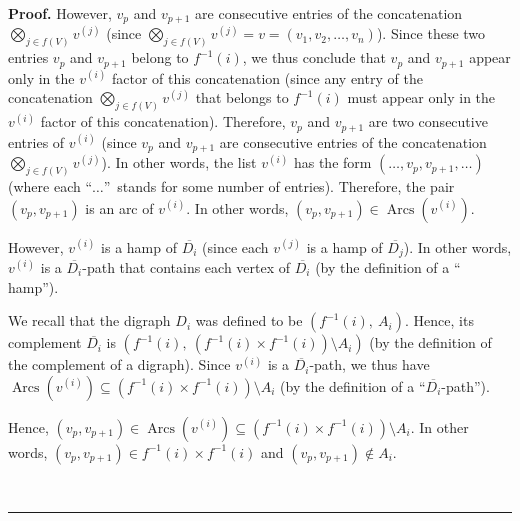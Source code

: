 \documentclass[numbers=enddot,12pt,final,onecolumn,notitlepage]{scrartcl}%
\numberwithin{exer}{section}
\theoremstyle{definition}
\newenvironment{proof}[1][Proof]{\noindent\textbf{#1.} }{\ \rule{0.5em}{0.5em}}
\newenvironment{verlong}{}{}
\begin{document}
\begin{verlong}
\begin{proof}
However, $v_{p}$ and $v_{p+1}$ are consecutive entries of the concatenation
$\bigotimes\limits_{j\in f\left(  V\right)  }v^{\left(  j\right)  }$ (since
$\bigotimes\limits_{j\in f\left(  V\right)  }v^{\left(  j\right)  }=v=\left(
v_{1},v_{2},\ldots,v_{n}\right)  $). Since these two entries $v_{p}$ and
$v_{p+1}$ belong to $f^{-1}\left(  i\right)  $, we thus conclude that $v_{p}$
and $v_{p+1}$ appear only in the $v^{\left(  i\right)  }$ factor of this
concatenation (since any entry of the concatenation $\bigotimes\limits_{j\in
f\left(  V\right)  }v^{\left(  j\right)  }$ that belongs to $f^{-1}\left(
i\right)  $ must appear only in the $v^{\left(  i\right)  }$ factor of this
concatenation). Therefore, $v_{p}$ and $v_{p+1}$ are two consecutive entries
of $v^{\left(  i\right)  }$ (since $v_{p}$ and $v_{p+1}$ are consecutive
entries of the concatenation $\bigotimes\limits_{j\in f\left(  V\right)
}v^{\left(  j\right)  }$). In other words, the list $v^{\left(  i\right)  }$
has the form $\left(  \ldots,v_{p},v_{p+1},\ldots\right)  $ (where each
\textquotedblleft$\ldots$\textquotedblright\ stands for some number of
entries). Therefore, the pair $\left(  v_{p},v_{p+1}\right)  $ is an arc of
$v^{\left(  i\right)  }$. In other words, $\left(  v_{p},v_{p+1}\right)
\in\operatorname*{Arcs}\left(  v^{\left(  i\right)  }\right)  $.

However, $v^{\left(  i\right)  }$ is a hamp of $\overline{D_{i}}$ (since each
$v^{\left(  j\right)  }$ is a hamp of $\overline{D_{j}}$). In other words,
$v^{\left(  i\right)  }$ is a $\overline{D_{i}}$-path that contains each
vertex of $\overline{D_{i}}$ (by the definition of a \textquotedblleft
hamp\textquotedblright).

We recall that the digraph $D_{i}$ was defined to be $\left(  f^{-1}\left(
i\right)  ,\ A_{i}\right)  $. Hence, its complement $\overline{D_{i}}$ is
$\left(  f^{-1}\left(  i\right)  ,\ \left(  f^{-1}\left(  i\right)  \times
f^{-1}\left(  i\right)  \right)  \setminus A_{i}\right)  $ (by the definition
of the complement of a digraph). Since $v^{\left(  i\right)  }$ is a
$\overline{D_{i}}$-path, we thus have $\operatorname*{Arcs}\left(  v^{\left(
i\right)  }\right)  \subseteq\left(  f^{-1}\left(  i\right)  \times
f^{-1}\left(  i\right)  \right)  \setminus A_{i}$ (by the definition of a
\textquotedblleft$\overline{D_{i}}$-path\textquotedblright).

Hence, $\left(  v_{p},v_{p+1}\right)  \in\operatorname*{Arcs}\left(
v^{\left(  i\right)  }\right)  \subseteq\left(  f^{-1}\left(  i\right)  \times
f^{-1}\left(  i\right)  \right)  \setminus A_{i}$. In other words, $\left(
v_{p},v_{p+1}\right)  \in f^{-1}\left(  i\right)  \times f^{-1}\left(
i\right)  $ and $\left(  v_{p},v_{p+1}\right)  \notin A_{i}$.


\end{proof}
\end{verlong}
\end{document}
